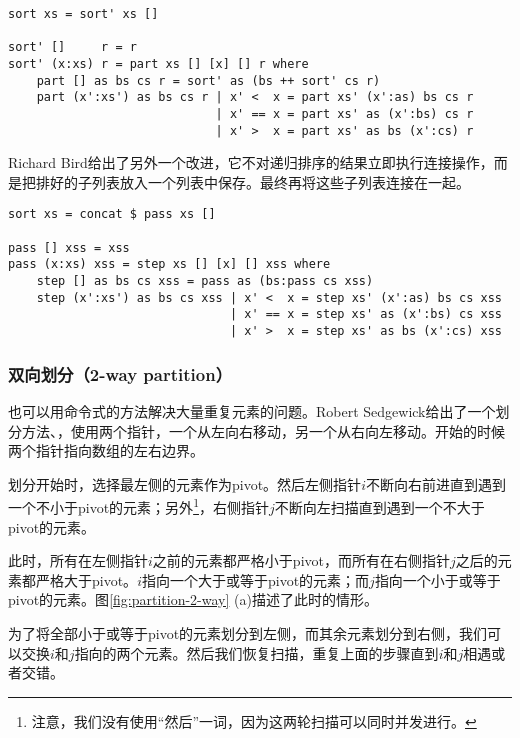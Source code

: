 \documentclass[UTF8]{article}
\begin{document}
\lstset{language=Haskell}
\begin{lstlisting}[style=Haskell]
sort xs = sort' xs []

sort' []     r = r
sort' (x:xs) r = part xs [] [x] [] r where
    part [] as bs cs r = sort' as (bs ++ sort' cs r)
    part (x':xs') as bs cs r | x' <  x = part xs' (x':as) bs cs r
                             | x' == x = part xs' as (x':bs) cs r
                             | x' >  x = part xs' as bs (x':cs) r
\end{lstlisting}

Richard Bird给出了另外一个改进\cite{fp-pearls}，它不对递归排序的结果立即执行连接操作，而是把排好的子列表放入一个列表中保存。最终再将这些子列表连接在一起。

\lstset{language=Haskell}
\begin{lstlisting}[style=Haskell]
sort xs = concat $ pass xs []

pass [] xss = xss
pass (x:xs) xss = step xs [] [x] [] xss where
    step [] as bs cs xss = pass as (bs:pass cs xss)
    step (x':xs') as bs cs xss | x' <  x = step xs' (x':as) bs cs xss
                               | x' == x = step xs' as (x':bs) cs xss
                               | x' >  x = step xs' as bs (x':cs) xss
\end{lstlisting} %

\subsubsection{双向划分（2-way partition）}

也可以用命令式的方法解决大量重复元素的问题。Robert Sedgewick给出了一个划分方法\cite{qsort-impl}、\cite{Bentley}，使用两个指针，一个从左向右移动，另一个从右向左移动。开始的时候两个指针指向数组的左右边界。

划分开始时，选择最左侧的元素作为pivot。然后左侧指针$i$不断向右前进直到遇到一个不小于pivot的元素；另外\footnote{注意，我们没有使用“然后”一词，因为这两轮扫描可以同时并发进行。}，右侧指针$j$不断向左扫描直到遇到一个不大于pivot的元素。

此时，所有在左侧指针$i$之前的元素都严格小于pivot，而所有在右侧指针$j$之后的元素都严格大于pivot。$i$指向一个大于或等于pivot的元素；而$j$指向一个小于或等于pivot的元素。图\ref{fig:partition-2-way} (a)描述了此时的情形。

为了将全部小于或等于pivot的元素划分到左侧，而其余元素划分到右侧，我们可以交换$i$和$j$指向的两个元素。然后我们恢复扫描，重复上面的步骤直到$i$和$j$相遇或者交错。
\end{document}
